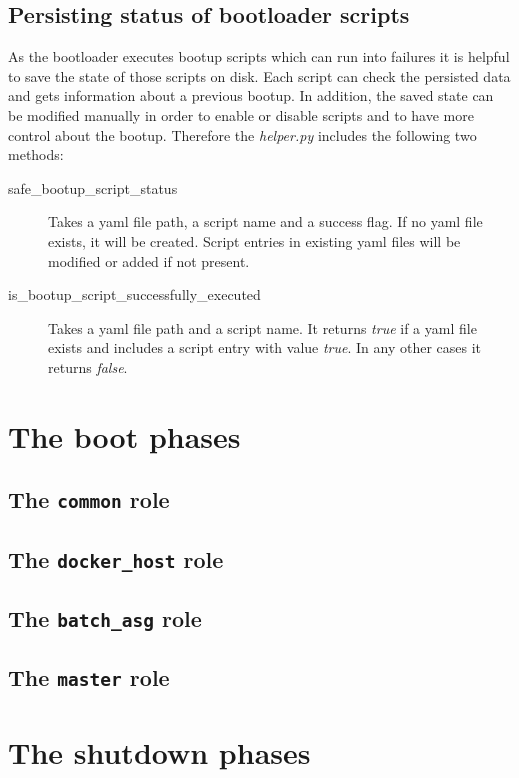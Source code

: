 		\subsection{Persisting status of bootloader scripts}
		As the bootloader executes bootup scripts which can run into failures it is helpful to save the state of those scripts on disk. Each script can check the persisted data and gets information about a previous bootup. In addition, the saved state can be modified manually in order to enable or disable scripts and to have more control about the bootup. Therefore the \emph{helper.py} includes the following two methods:
		\begin{description}
			\item[safe\_bootup\_script\_status] Takes a yaml file path, a script name and a success flag. If no yaml file exists, it will be created. Script entries in existing yaml files will be modified or added if not present. 
			\item[is\_bootup\_script\_successfully\_executed] Takes a yaml file path and a script name. It returns \emph{true} if a yaml file exists and includes a script entry with value \emph{true}. In any other cases it returns \emph{false}.
		\end{description}
	\section{The boot phases}
		\subsection{The \texttt{common} role}
		\subsection{The \texttt{docker\_host} role}
		\subsection{The \texttt{batch\_asg} role}
		\subsection{The \texttt{master} role}
	\section{The shutdown phases}